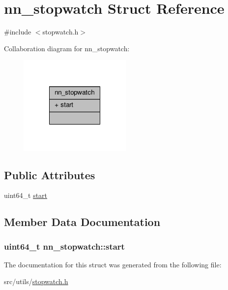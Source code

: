 \hypertarget{structnn__stopwatch}{}\section{nn\+\_\+stopwatch Struct Reference}
\label{structnn__stopwatch}


{\ttfamily \#include $<$stopwatch.\+h$>$}



Collaboration diagram for nn\+\_\+stopwatch\+:\nopagebreak
\begin{figure}[H]
\begin{center}
\leavevmode
\includegraphics[width=156pt]{structnn__stopwatch__coll__graph}
\end{center}
\end{figure}
\subsection*{Public Attributes}
\begin{DoxyCompactItemize}
\item 
uint64\+\_\+t \hyperlink{structnn__stopwatch_ab4d2a8e4ebfaf24c401772ce5c54685b}{start}
\end{DoxyCompactItemize}


\subsection{Member Data Documentation}
\subsubsection[{start}]{\setlength{\rightskip}{0pt plus 5cm}uint64\+\_\+t nn\+\_\+stopwatch\+::start}\hypertarget{structnn__stopwatch_ab4d2a8e4ebfaf24c401772ce5c54685b}{}\label{structnn__stopwatch_ab4d2a8e4ebfaf24c401772ce5c54685b}


The documentation for this struct was generated from the following file\+:\begin{DoxyCompactItemize}
\item 
src/utils/\hyperlink{stopwatch_8h}{stopwatch.\+h}\end{DoxyCompactItemize}

